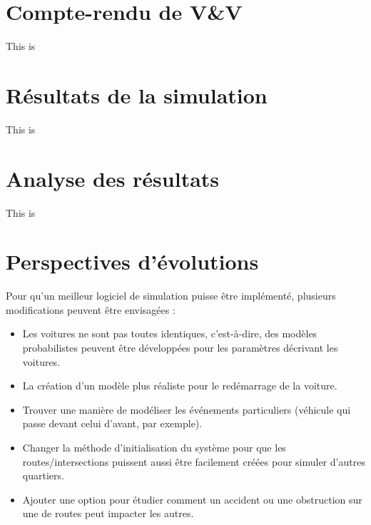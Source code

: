 \documentclass[12pt]{article} %
\begin{document}
\newpage
\section{Compte-rendu de V\&V}\label{VV}
This is

\newpage
\section{Résultats de la simulation}\label{resultats-sim}
This is

\newpage
\section{Analyse des résultats}\label{resultats-analyse}
This is

\newpage
\section{Perspectives d'évolutions}\label{evolution}
Pour qu’un meilleur logiciel de simulation puisse être implémenté, plusieurs modifications peuvent être envisagées : 

\begin{itemize}
\item Les voitures ne sont pas toutes identiques, c’est-à-dire, des modèles probabilistes peuvent être développées pour les paramètres décrivant les voitures. 

\item La création d’un modèle plus réaliste pour le redémarrage de la voiture. 

\item Trouver une manière de modéliser les événements particuliers (véhicule qui passe devant celui d’avant, par exemple). 

\item Changer la méthode d'initialisation du système pour que les routes/intersections puissent aussi être facilement créées pour simuler d'autres quartiers.

\item Ajouter une option pour étudier comment un accident ou une obstruction sur une de routes peut impacter les autres.
\end{itemize}
\end{document}
